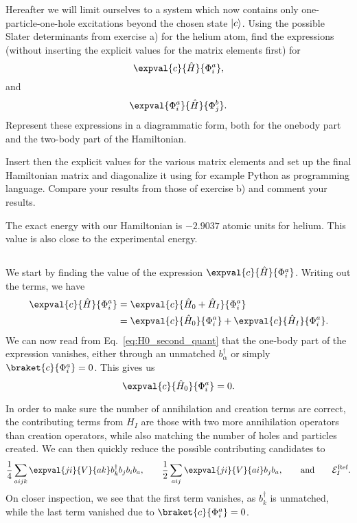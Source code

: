 Hereafter we will limit ourselves to a system which now contains only one-particle-one-hole excitations beyond the chosen state $\lvert c\rangle$.
Using the possible Slater determinants from exercise a) for the helium atom, find the expressions (without inserting the explicit values for the matrix elements first) for %
\begin{equation*}
    \expval{c}{\hat{H}}{\Phi_i^a},
\end{equation*}
and
\begin{equation*}
    \expval{\Phi_i^a}{\hat{H}}{\Phi_j^b}.
\end{equation*}
Represent these expressions in a diagrammatic form, both for the onebody part and the two-body part of the Hamiltonian.

Insert then the explicit values for the various matrix elements and set up the final Hamiltonian matrix and diagonalize it using for example Python as programming language.
Compare your results from those of exercise b) and comment your results. %

The exact energy with our Hamiltonian is $-2.9037$ atomic units for helium.
This value is also close to the experimental energy.

\subsection{}
We start by finding the value of the expression $\expval{c}{\hat{H}}{\Phi_i^a}$.
Writing out the terms, we have
\begin{align*}
    \expval{c}{\hat{H}}{\Phi_i^a} &= \expval{c}{\hat{H}_0 + \hat{H}_I}{\Phi_i^a} \\
    &= \expval{c}{\hat{H}_0}{\Phi_i^a} + \expval{c}{\hat{H}_I}{\Phi_i^a}.
\end{align*}
We can now read from Eq.~\eqref{eq:H0_second_quant} that the one-body part of the expression vanishes, either through an unmatched $b_\alpha^\dagger$ or simply $\braket{c}{\Phi_i^a} = 0$.
This gives us
\begin{equation}\label{eq:1p1h-ground-onebody}
    \expval{c}{\hat{H}_0}{\Phi_i^a} = 0.
\end{equation}

In order to make sure the number of annihilation and creation terms are correct, the contributing terms from $H_I$ are those with two more annihilation operators than creation operators, while also matching the number of holes and particles created.
We can then quickly reduce the possible contributing candidates to
\begin{equation*}
    \frac{1}{4} \sum_{aijk} \expval{ji}{V}{ak} b_k^\dagger b_j b_i b_a, \qquad
    \frac{1}{2} \sum_{aij} \expval{ji}{V}{ai} b_j b_a, \qquad
    \text{and} \qquad \mathcal{E}_I^\text{Ref}.
\end{equation*}
On closer inspection, we see that the first term vanishes, as $b_k^\dagger$ is unmatched, while the last term vanished due to $\braket{c}{\Phi_i^a} = 0$.

